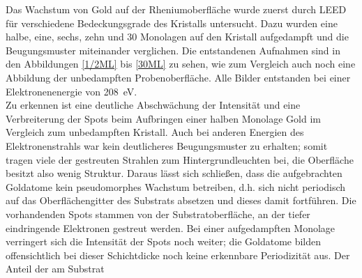 Das Wachstum von Gold auf der Rheniumoberfläche wurde zuerst durch LEED für
verschiedene Bedeckungsgrade des Kristalls untersucht. Dazu wurden eine halbe, eine, sechs, zehn und
30 Monolagen auf den Kristall aufgedampft und die Beugungsmuster miteinander verglichen. Die
entstandenen Aufnahmen sind in den Abbildungen \ref{1/2ML} bis \ref{30ML} zu sehen, wie zum
Vergleich auch noch eine Abbildung der unbedampften Probenoberfläche. Alle Bilder entstanden
bei einer Elektronenenergie von \SI{208}{eV}.
\\
Zu erkennen ist eine deutliche Abschwächung der Intensität und eine Verbreiterung der Spots beim
Aufbringen einer halben Monolage Gold im Vergleich zum unbedampften Kristall. Auch bei anderen Energien des
Elektronenstrahls war kein deutlicheres Beugungsmuster zu erhalten; somit tragen viele der
gestreuten Strahlen zum Hintergrundleuchten bei, die Oberfläche besitzt also wenig Struktur.
Daraus lässt sich schließen, dass die aufgebrachten Goldatome kein pseudomorphes Wachstum betreiben, d.h.
sich nicht periodisch auf das Oberflächengitter des Substrats absetzen und dieses damit fortführen.
Die vorhandenden Spots stammen von der Substratoberfläche, an der tiefer eindringende Elektronen
gestreut werden. Bei einer aufgedampften Monolage verringert sich die Intensität der Spots noch
weiter; die Goldatome bilden offensichtlich bei dieser Schichtdicke noch keine erkennbare
Periodizität aus. Der Anteil der am Substrat

